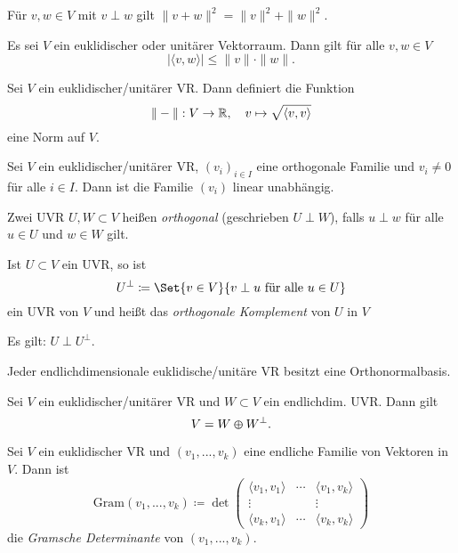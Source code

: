 \documentclass{cheat-sheet}
\newcommand{\Gram}{\mathrm{Gram}}
\begin{document}
\begin{satz}
Für $v, w \in V$ mit $v \perp w$ gilt $\| v + w \|^2 = \| v \|^2 + \| w \|^2$.
\end{satz}

\begin{satz}
Es sei $V$ ein euklidischer oder unitärer Vektorraum. Dann gilt für alle $v, w \in V$
\[ | \langle v, w \rangle | \le \| v \| \cdot \| w \|. \]
\end{satz}

\begin{satz}
Sei $V$ ein euklidischer/unitärer VR. Dann definiert die Funktion
\[ \| - \| : V \to \mathbb{R}, \quad v \mapsto \sqrt{ \langle v , v \rangle } \]
eine Norm auf $V$.
\end{satz}

\begin{satz}
Sei $V$ ein euklidischer/unitärer VR, $(v_i)_{i \in I}$ eine orthogonale Familie und $v_i \not= 0$ für alle $i \in I$. Dann ist die Familie $(v_i)$ linear unabhängig.
\end{satz}

\begin{defn}
Zwei UVR $U, W \subset V$ heißen \emph{orthogonal} (geschrieben $U \perp W$), falls $u \perp w$ für alle $u \in U$ und $w \in W$ gilt.
\end{defn}

\begin{defn}
Ist $U \subset V$ ein UVR, so ist
\[ U^{\perp} \coloneqq \Set{ v \in V }{ v \perp u \text{ für alle } u \in U } \]
ein UVR von $V$ und heißt das \emph{orthogonale Komplement} von $U$ in $V$
\end{defn}

\begin{bem}
Es gilt: $U \perp U^{\perp}$.
\end{bem}

\begin{satz}
Jeder endlichdimensionale euklidische/unitäre VR besitzt eine Orthonormalbasis.
\end{satz}


 \begin{kor}
 Sei $V$ ein euklidischer/unitärer VR und $W \subset V$ ein endlichdim. UVR. Dann gilt
 \[ V = W \varoplus W^{\perp}. \]
 \end{kor}

\begin{defn}
Sei $V$ ein euklidischer VR und $(v_1, ..., v_k)$ eine endliche Familie von Vektoren in $V$. Dann ist
\[ \Gram(v_1, ..., v_k) \coloneqq \det \begin{pmatrix}
\langle v_1 , v_1 \rangle & \cdots & \langle v_1 , v_k \rangle \\
\vdots & & \vdots \\
\langle v_k , v_1 \rangle & \cdots & \langle v_k , v_k \rangle
\end{pmatrix} \]
die \emph{Gramsche Determinante} von $(v_1, ..., v_k)$.
\end{defn}
\end{document}

